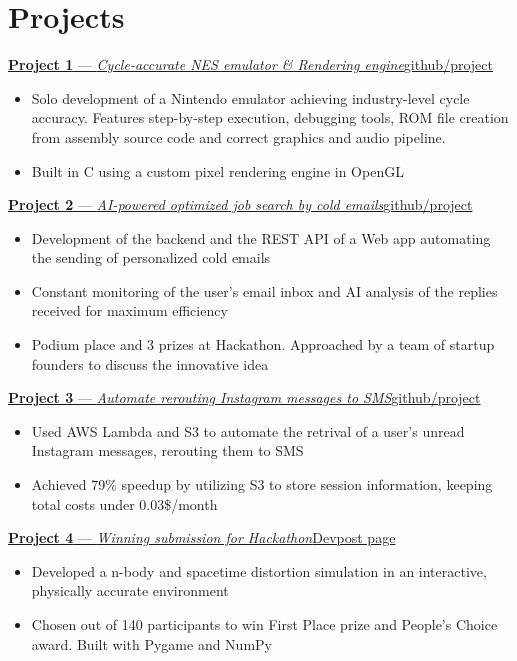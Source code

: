 \documentclass{article}
\newcommand{\shortlinkrole}[4]{
    {\href{#3}{\normalfont\textbf{#1} --- \textit{#2}\hfill#4\:\faExternalLink}\vspace*{-4pt}}
}
\newenvironment{bulletpoints}{\begin{itemize}\setlength\itemsep{-0.2em}}{\end{itemize}}
\begin{document}
\section*{Projects}

\shortlinkrole{Project 1}{Cycle-accurate NES emulator \& Rendering engine}{https://github.com/}{github/project}
\begin{bulletpoints}
    \item Solo development of a Nintendo emulator achieving industry-level cycle accuracy. Features step-by-step execution, debugging tools, ROM file creation from assembly source code and correct graphics and audio pipeline.
    \item Built in C using a custom pixel rendering engine in OpenGL
\end{bulletpoints}

\shortlinkrole{Project 2}{AI-powered optimized job search by cold emails}{https://github.com/}{github/project}
\begin{bulletpoints}
    \item Development of the backend and the REST API of a Web app automating the sending of personalized cold emails
    \item Constant monitoring of the user's email inbox and AI analysis of the replies received for maximum efficiency
    \item Podium place and 3 prizes at Hackathon. Approached by a team of startup founders to discuss the innovative idea
\end{bulletpoints}

\shortlinkrole{Project 3}{Automate rerouting Instagram messages to SMS}{https://github.com/}{github/project}
\begin{bulletpoints}
    \item Used AWS Lambda and S3 to automate the retrival of a user's unread Instagram messages, rerouting them to SMS
    \item Achieved 79\% speedup by utilizing S3 to store session information, keeping total costs under 0.03\$/month
\end{bulletpoints}

\shortlinkrole{Project 4}{Winning submission for Hackathon}{https://devpost.com/software/}{Devpost page}
\begin{bulletpoints}
    \item Developed a n-body and spacetime distortion simulation in an interactive, physically accurate environment
    \item Chosen out of 140 participants to win First Place prize and People's Choice award. Built with Pygame and NumPy
\end{bulletpoints}
\end{document}
